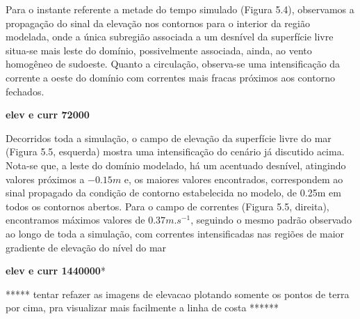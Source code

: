 \documentclass[11pt]{article}
\begin{document}
Para o instante referente a metade do tempo simulado (Figura 5.4),
observamos a propagação do sinal da elevação nos contornos para o
interior da região modelada, onde a única subregião associada a um
desnível da superfície livre situa-se mais leste do domínio,
possivelmente associada, ainda, ao vento homogêneo de sudoeste. Quanto a
circulação, observa-se uma intensificação da corrente a oeste do domínio
com correntes mais fracas próximos aos contorno fechados.

\textbf{elev e curr 72000}

Decorridos toda a simulação, o campo de elevação da superfície livre do
mar (Figura 5.5, esquerda) mostra uma intensificação do cenário já
discutido acima. Nota-se que, a leste do domínio modelado, há um
acentuado desnível, atingindo valores próximos a \(-0.15m\) e, os
maiores valores encontrados, correspondem ao sinal propagado da condição
de contorno estabelecida no modelo, de 0.25m em todos os contornos
abertos. Para o campo de correntes (Figura 5.5, direita), encontramos
máximos valores de \(0.37 m.s^{-1}\), seguindo o mesmo padrão observado
ao longo de toda a simulação, com correntes intensificadas nas regiões
de maior gradiente de elevação do nível do mar

\textbf{elev e curr 1440000}*

***** tentar refazer as imagens de elevacao plotando somente os pontos
de terra por cima, pra visualizar mais facilmente a linha de costa
******


    
    
    
    
\end{document}
